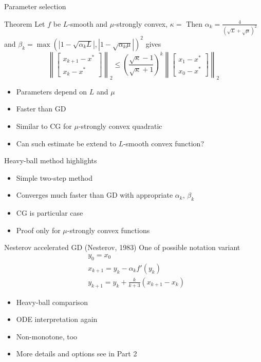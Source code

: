 \documentclass{beamer}
\begin{document}
\begin{frame}{Parameter selection}
\begin{block}{Theorem}
Let $f$ be $L$-smooth and $\mu$-strongly convex, $\kappa = $ Then $\alpha_k = \frac{4}{(\sqrt{L} + \sqrt{\mu})^2}$ and $\beta_k = \max(|1 - \sqrt{\alpha_k L}|, |1 - \sqrt{\alpha_k \mu}|)^2$ gives
\begin{equation*}
\left \|
\begin{bmatrix}
x_{k+1} - x^*\\
x_k - x^*
\end{bmatrix}
\right \|_2
\leq \left( \frac{\sqrt{\kappa} - 1}{\sqrt{\kappa} + 1} \right)^k
\left \|
\begin{bmatrix}
x_1 - x^*\\
x_0 - x^*
\end{bmatrix}
\right \|_2
\end{equation*}
\end{block}
\begin{itemize}
\item Parameters depend on $L$ and $\mu$
\item Faster than GD
\item Similar to CG for $\mu$-strongly convex quadratic
\item Can such estimate be extend to $L$-smooth convex function?
\end{itemize}
\end{frame}

\begin{frame}{Heavy-ball method highlights}
\begin{itemize}
\item Simple two-step method
\item Converges much faster than GD with appropriate $\alpha_k$, $\beta_k$
\item CG is particular case
\item Proof only for $\mu$-strongly convex functions
\end{itemize}
\end{frame}

\begin{frame}{Nesterov accelerated GD (Nesterov, 1983)}
One of possible notation variant
\begin{equation*}
\begin{split}
& y_0 = x_0 \\
& x_{k+1} = y_k - \alpha_k f'(y_k)\\
& y_{k+1} = y_k + \frac{k}{k + 3} (x_{k+1} - x_k)
\end{split}
\end{equation*}

\begin{itemize}
\item Heavy-ball comparison
\item ODE interpretation again
\item Non-monotone, too
\item More details and options see in Part 2
\end{itemize}
\end{frame}
\end{document}
